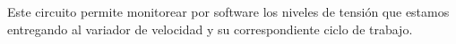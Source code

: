 


Este circuito permite monitorear por software los niveles de tensión que estamos entregando al variador de velocidad y su correspondiente ciclo de trabajo.

